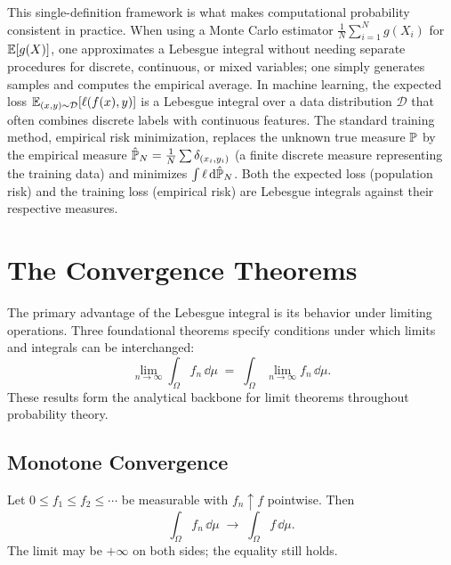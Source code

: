 \begin{applicationbox}
This single-definition framework is what makes computational probability
consistent in practice. When using a Monte Carlo estimator
$\frac1N\sum_{i=1}^N g(X_i)$ for $\E[g(X)]$, one approximates a Lebesgue
integral without needing separate procedures for discrete, continuous, or mixed
variables; one simply generates samples and computes the empirical average.
In machine learning, the expected loss $\E_{(x,y)\sim\mathcal D}[\ell(f(x),y)]$
is a Lebesgue integral over a data distribution $\mathcal D$ that often combines
discrete labels with continuous features. The standard training method, empirical risk minimization, replaces
the unknown true measure $\P$ by the empirical measure $\hat\P_N=\frac1N\sum\delta_{(x_i,y_i)}$
(a finite discrete measure representing the training data) and minimizes $\int \ell\,\dd\hat\P_N$.
Both the expected loss (population risk) and the training loss (empirical risk) are Lebesgue integrals against their
respective measures.
\end{applicationbox}

\section{The Convergence Theorems}
\label{ch37:convergence}

The primary advantage of the Lebesgue integral is its behavior under limiting
operations. Three foundational theorems specify conditions under which limits
and integrals can be interchanged:
\[
  \lim_{n\to\infty} \int_\Omega f_n\,\dd\mu \;=\; \int_\Omega \lim_{n\to\infty} f_n\,\dd\mu.
\]
These results form the analytical backbone for limit theorems throughout probability theory.

\subsection{Monotone Convergence}

\begin{theorem}
\label{ch37:thm-mct}
Let $0\le f_1\le f_2\le\cdots$ be measurable with $f_n\uparrow f$ pointwise.
Then
\[
  \int_\Omega f_n\,\dd\mu \;\longrightarrow\; \int_\Omega f\,\dd\mu .
\]
The limit may be $+\infty$ on both sides; the equality still holds.
\end{theorem}


